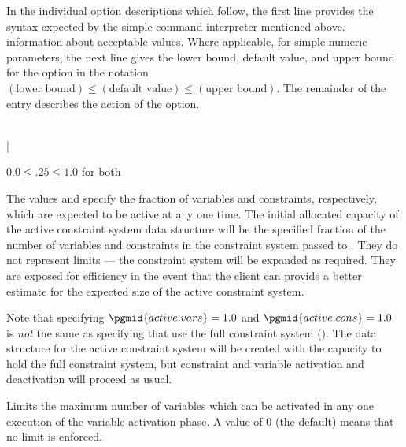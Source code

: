 In the individual option descriptions which follow, the first line provides
the syntax expected by the simple command interpreter mentioned above.
information about acceptable values.
Where applicable, for simple numeric parameters, the next line gives
the lower bound, default value, and upper bound for the option in the
notation
$(\text{lower bound}) \leq (\text{default value}) \leq
 (\text{upper bound})$.
The remainder of the entry describes the action of the option.

\begin{codedoc}
  \item{}

  \bgroup \raggedright
     \kw{;} \\
   \bnfeq
      |  
  \egroup

  $0.0 \leq .25 \leq 1.0$ for both

  The values  and  specify the fraction
  of variables and constraints, respectively, which are expected to be active
  at any one time.
  The initial allocated capacity of the active constraint system data structure
  will be the specified fraction of the number of variables and constraints
  in the constraint system passed to .
  They do not represent limits --- the constraint system will be expanded as
  required.
  They are exposed for efficiency in the event that the client can provide
  a better estimate for the expected size of the active constraint system.

  Note that specifying $\pgmid{active.vars} = 1.0$ and
  $\pgmid{active.cons} = 1.0$ is \textit{not} the same as specifying
  that \dylp use the full constraint system (\cf {}).
  The data structure for the active constraint system will be created with
  the capacity to hold the full constraint system, but constraint and variable
  activation and deactivation will proceed as usual.


  \item{}
    \kw{;}

  Limits the maximum number of variables which can be activated in any
  one execution of the variable activation phase.
  A value of 0 (the default) means that no limit is enforced.

  \item{}
    \kw{;}


\end{codedoc}

